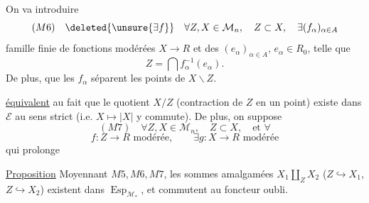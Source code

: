 
On va introduire
\[
(M6)\quad \deleted{\unsure{\exists f}}\quad
\forall Z,X\in\mathcal M_n,\quad Z\subset X,\quad\exists(f_\alpha)_{\alpha\in A}
\]
famille finie de fonctions modérées $X\longrightarrow R$ et des $(e_\alpha)_{\alpha\in A}$, $e_\alpha\in R_0$, telle que
\[
 Z=\bigcap f_\alpha^{-1}(e_\alpha).
\]
De plus,  que les $f_\alpha$ séparent les points de $X\smallsetminus Z$.




 \uline{équivalent} au fait que le quotient $X/Z$ (contraction de $Z$ en un point) existe dans $\mathcal E$ au sens strict (i.e. $X\mapsto|X|$ y commute). De plus, on suppose
\[
(M7)\quad\forall Z,X\in\mathcal M_n,\quad Z\subset X,\quad\text{et }\forall
\]
\[
f:Z\longrightarrow R\text{ modérée},\qquad\exists g:X\longrightarrow R\text{ modérée}
\]
qui prolonge

\uline{Proposition} Moyennant $M5,M6,M7$, les sommes amalgamées $X_1\amalg_Z X_2$ ($Z\hookrightarrow X_1$, $Z\hookrightarrow X_2$) existent dans $\operatorname{Esp}_{\mathcal M_*}$, et commutent au foncteur oubli.

